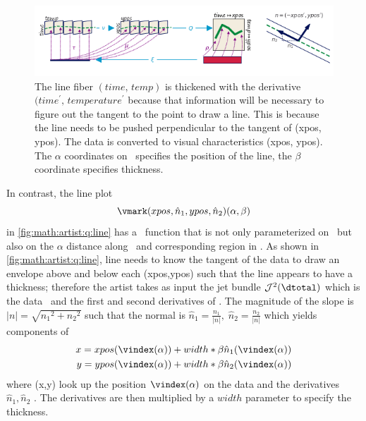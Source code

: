 \documentclass[../main.tex]{subfiles}
\begin{document}
\begin{figure}[H]
    \includegraphics[width=\textwidth]{figures/math/line_with_s.png}
    \caption{The line fiber $(time,\, temp)$ is thickened with the derivative $(time^{\prime},\, temperature^{\prime}$ because that information will be necessary to figure out the tangent to the point to draw a line. This is because the line needs to be pushed perpendicular to the tangent of (xpos, ypos). The data is converted to visual characteristics (xpos, ypos). The $\alpha$ coordinates on \gbase\ specifies the position of the line, the $\beta$ coordinate specifies thickness.}
    \label{fig:artist_line}
\end{figure}
In contrast, the line plot 
\begin{equation}
\vmark(xpos, \hat{n}_{1}, ypos, \hat{n}_{2})(\alpha, \beta)
\label{eq:math:artist:q:line}
\end{equation}
in \autoref{fig:math:artist:q:line} has a \vindex\ function that is not only parameterized on \dbasepoint\ but also on the $\alpha$ distance along \dbasepoint\ and corresponding region in \gbase. As shown in \autoref{fig:math:artist:q:line}, line needs to know the tangent of the data to draw an envelope above and below each (xpos,ypos) such that the line appears to have a thickness; therefore the artist takes as input the jet bundle \cite{JetBundle2020,musilovaCalculusVariationsJet2016} $\mathcal{J}^{2}(\dtotal)$ which is the data \dtotal\ and the first and second derivatives of \dtotal. The magnitude of the slope is $\lvert n \rvert = \sqrt{{n_{1}}^2 + {n_{2}}^2}$
such that the normal is  $\hat{n}_{1} = \frac{n_1}{\lvert n \rvert}, \; \hat{n}_{2} = \frac{n_2}{\lvert n \rvert}$ which yields components of \gsection\
\begin{align*}
 x = xpos(\vindex(\alpha)) &+ width*\beta\hat{n}_1(\vindex(\alpha)) \\
 y = ypos(\vindex(\alpha)) &+ width*\beta\hat{n}_2(\vindex(\alpha)) 
\end{align*}
where (x,y) look up the position $\vindex(\alpha)$ on the data and the derivatives $\hat{n}_1, \hat{n}_2$ . The derivatives are then multiplied by a $width$ parameter to specify the thickness.
\end{document}
